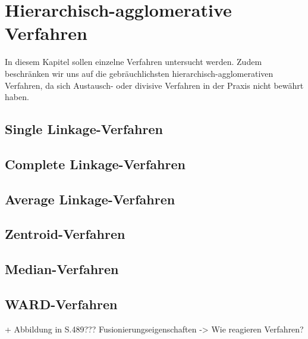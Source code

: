 \chapter{Hierarchisch-agglomerative Verfahren}

In diesem Kapitel sollen einzelne Verfahren untersucht werden. Zudem beschränken wir uns auf die gebräuchlichsten hierarchisch-agglomerativen Verfahren, da sich Austausch- oder divisive Verfahren in der Praxis nicht bewährt haben.

\section{Single Linkage-Verfahren}
\section{Complete Linkage-Verfahren}
\section{Average Linkage-Verfahren}
\section{Zentroid-Verfahren}
\section{Median-Verfahren}
\section{WARD-Verfahren}

+ Abbildung in \cite{Backhaus.2016} S.489??? Fusionierungseigenschaften -> Wie reagieren Verfahren?